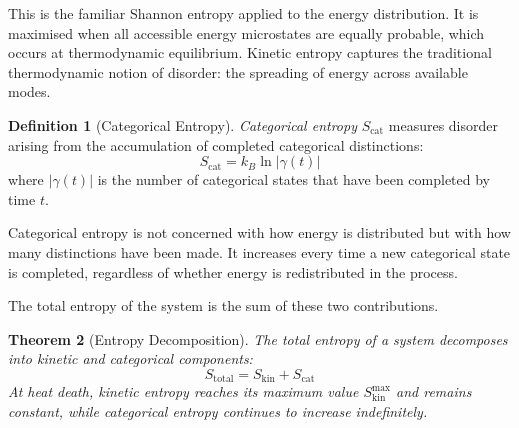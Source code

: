 \documentclass[12pt,a4paper]{article}
\newtheorem{theorem}{Theorem}[section]
\theoremstyle{definition}
\newtheorem{definition}[theorem]{Definition}
\theoremstyle{remark}
\begin{document}
This is the familiar Shannon entropy applied to the energy distribution. It is maximised when all accessible energy microstates are equally probable, which occurs at thermodynamic equilibrium. Kinetic entropy captures the traditional thermodynamic notion of disorder: the spreading of energy across available modes.

\begin{definition}[Categorical Entropy]
\label{def:cat_entropy_full}
\emph{Categorical entropy} $S_{\text{cat}}$ measures disorder arising from the accumulation of completed categorical distinctions:
\begin{equation}
S_{\text{cat}} = k_B \ln |\gamma(t)|
\end{equation}
where $|\gamma(t)|$ is the number of categorical states that have been completed by time $t$.
\end{definition}

Categorical entropy is not concerned with how energy is distributed but with how many distinctions have been made. It increases every time a new categorical state is completed, regardless of whether energy is redistributed in the process.

The total entropy of the system is the sum of these two contributions.

\begin{theorem}[Entropy Decomposition]
\label{thm:entropy_decomposition}
The total entropy of a system decomposes into kinetic and categorical components:
\begin{equation}
S_{\text{total}} = S_{\text{kin}} + S_{\text{cat}}
\end{equation}
At heat death, kinetic entropy reaches its maximum value $S_{\text{kin}}^{\max}$ and remains constant, while categorical entropy continues to increase indefinitely.
\end{theorem}
\end{document}

